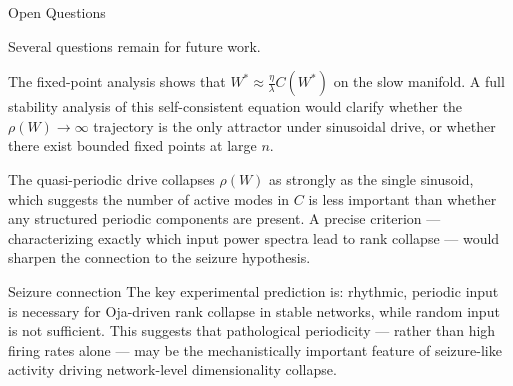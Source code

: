 \documentclass[
11pt,notheorems,hyperref={pdfauthor=whatever}
]{beamer}
\begin{document}
\begin{frame}{Open Questions}
\small

Several questions remain for future work.

\vspace{0.4em}

The fixed-point analysis shows that $W^\ast \approx \frac{\eta}{\lambda}C(W^\ast)$
on the slow manifold. A full stability analysis of this self-consistent equation
would clarify whether the $\rho(W)\to\infty$ trajectory is the only attractor
under sinusoidal drive, or whether there exist bounded fixed points at large $n$.

\vspace{0.4em}

The quasi-periodic drive collapses $\rho(W)$ as strongly as the single sinusoid,
which suggests the number of active modes in $C$ is less important than whether
any structured periodic components are present. A precise criterion —
characterizing exactly which input power spectra lead to rank collapse — would
sharpen the connection to the seizure hypothesis.

\vspace{0.4em}

\begin{block}{Seizure connection}
The key experimental prediction is: rhythmic, periodic input is necessary
for Oja-driven rank collapse in stable networks, while random input is
not sufficient. This suggests that pathological periodicity — rather than
high firing rates alone — may be the mechanistically important feature
of seizure-like activity driving network-level dimensionality collapse.
\end{block}

\end{frame}
\end{document}
